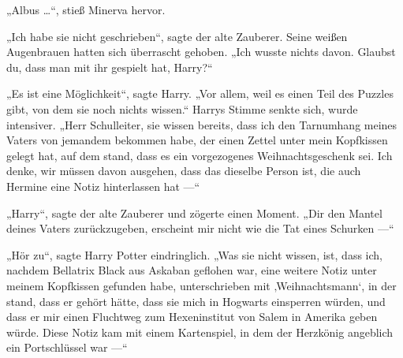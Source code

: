 „Albus …“, stieß Minerva hervor.

„Ich habe sie nicht geschrieben“, sagte der alte Zauberer. Seine weißen Augenbrauen hatten sich überrascht gehoben.
„Ich wusste nichts davon. Glaubst du, dass man mit ihr gespielt hat, Harry?“

„Es ist eine Möglichkeit“, sagte Harry.
„Vor allem, weil es einen Teil des Puzzles gibt, von dem sie noch nichts wissen.“ Harrys Stimme senkte sich, wurde intensiver.
„Herr Schulleiter, sie wissen bereits, dass ich den Tarnumhang meines Vaters von jemandem bekommen habe, der einen Zettel unter mein Kopfkissen gelegt hat, auf dem stand, dass es ein vorgezogenes Weihnachtsgeschenk sei. Ich denke, wir müssen davon ausgehen, dass das dieselbe Person ist, die auch Hermine eine Notiz hinterlassen hat —“

„Harry“, sagte der alte Zauberer und zögerte einen Moment.
„Dir den Mantel deines Vaters zurückzugeben, erscheint mir nicht wie die Tat eines Schurken —“

„Hör zu“, sagte Harry Potter eindringlich.
„Was sie nicht wissen, ist, dass ich, nachdem Bellatrix Black aus Askaban geflohen war, eine weitere Notiz unter meinem Kopfkissen gefunden habe, unterschrieben mit ‚Weihnachtsmann‘, in der stand, dass er gehört hätte, dass sie mich in Hogwarts einsperren würden, und dass er mir einen Fluchtweg zum Hexeninstitut von Salem in Amerika geben würde. Diese Notiz kam mit einem Kartenspiel, in dem der Herzkönig angeblich ein Portschlüssel war —“

